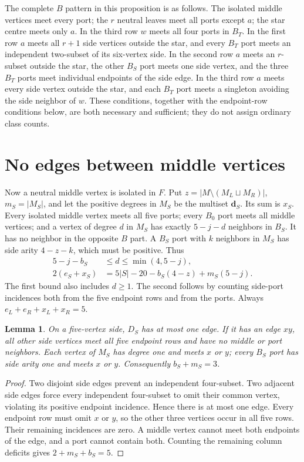 \documentclass[11pt]{article}
\newtheorem{lemma}[theorem]{Lemma}
\newcommand{\sq}{\sqcup}
\begin{document}
The complete $B$ pattern in this proposition is as follows. The isolated
middle vertices meet every port; the $r$ neutral leaves meet all ports
except $a$; the star centre meets only $a$. In the third row $w$ meets
all four ports in $B_T$. In the first row $a$ meets all $r+1$ side
vertices outside the star, and every $B_T$ port meets an independent
two-subset of its six-vertex side. In the second row $a$ meets an
$r$-subset outside the star, the other $B_S$ port meets one side vertex,
and the three $B_T$ ports meet individual endpoints of the side edge.
In the third row $a$ meets every side vertex outside the star, and
each $B_T$ port meets a singleton avoiding the side neighbor of $w$.
These conditions, together with the endpoint-row conditions below, are
both necessary and sufficient; they do not assign ordinary class counts.

\section{No edges between middle vertices}

Now a neutral middle vertex is isolated in $F$. Put $z=|M\setminus
(M_L\sq M_R)|$, $m_S=|M_S|$, and let the positive degrees in $M_S$ be
the multiset $\mathbf d_S$. Its sum is $x_S$. Every isolated middle
vertex meets all five ports; every $B_0$ port meets all middle vertices;
and a vertex of degree $d$ in $M_S$ has exactly $5-j-d$ neighbors in
$B_S$. It has no neighbor in the opposite $B$ part. A $B_S$ port with
$k$ neighbors in $M_S$ has side arity $4-z-k$, which must be positive.
Thus
\begin{align}
 5-j-b_S&\leq d\leq\min(4,5-j),\label{degreebound}\\
 2(e_S+x_S)&=5|S|-20-b_S(4-z)+m_S(5-j).\label{balance}
\end{align}
The first bound also includes $d\geq1$. The second follows by counting
side-port incidences both from the five endpoint rows and from the ports.
Always $e_L+e_R+x_L+x_R=5$.

\begin{lemma}\label{five}
On a five-vertex side, $D_S$ has at most one edge. If it has an edge
$xy$, all other side vertices meet all five endpoint rows and have no
middle or port neighbors. Each vertex of $M_S$ has degree one and meets
$x$ or $y$; every $B_S$ port has side arity one and meets $x$ or $y$.
Consequently $b_S+m_S=3$.
\end{lemma}
\begin{proof}
Two disjoint side edges prevent an independent four-subset. Two adjacent
side edges force every independent four-subset to omit their common
vertex, violating its positive endpoint incidence. Hence there is at
most one edge. Every endpoint row must omit $x$ or $y$, so the other
three vertices occur in all five rows. Their remaining incidences are
zero. A middle vertex cannot meet both endpoints of the edge, and a
port cannot contain both. Counting the remaining column deficits gives
$2+m_S+b_S=5$.
\end{proof}
\end{document}
